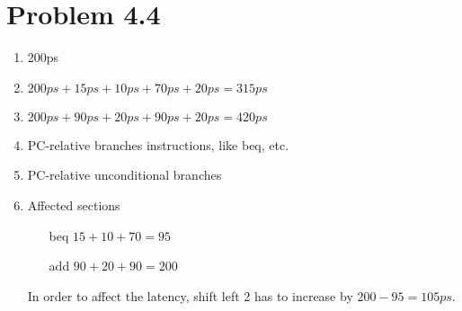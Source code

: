 \documentclass{article}
\def\math#1{$#1$}
\begin{document}
\section{Problem 4.4}
\begin{enumerate}[1)]
    \item 200ps
    \item \math{200ps + 15ps + 10ps + 70ps + 20ps = 315ps}
    \item \math{200ps + 90ps + 20ps + 90ps + 20ps = 420ps}
    \item PC-relative branches instructions, like beq, etc.
    \item PC-relative unconditional branches
    \item Affected sections
        \begin{itemize}
            \item [beq] \math{15 + 10 + 70 = 95}
            \item [add] \math{90 + 20 + 90 = 200}
        \end{itemize}
    In order to affect the latency, shift left 2 has to increase by \math{200 - 95 = 105ps}.
\end{enumerate}
\end{document}
